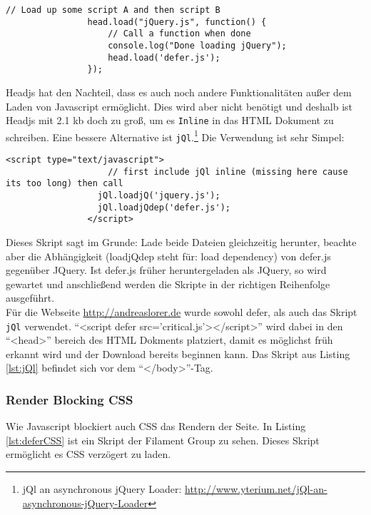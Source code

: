 				\begin{lstlisting}[captionpos=b, caption=Headjs dependency loading (Listing nach http://headjs.com/), label=lst:headjs]
				// Load up some script A and then script B
				head.load("jQuery.js", function() {
				    // Call a function when done
				    console.log("Done loading jQuery");
				    head.load('defer.js');
				});
				\end{lstlisting}

				Headjs hat den Nachteil, dass es auch noch andere Funktionalitäten außer dem Laden von Javascript ermöglicht. Dies wird aber nicht benötigt und deshalb ist Headjs mit 2.1 kb doch zu groß, um es \texttt{Inline} in das HTML Dokument zu schreiben. Eine bessere Alternative ist \texttt{jQl}.\footnote{jQl an asynchronous jQuery Loader: \url{http://www.yterium.net/jQl-an-asynchronous-jQuery-Loader}}
				Die Verwendung ist sehr Simpel:

				\begin{lstlisting}[captionpos=b, caption=jQl asynchronous jQuery-Loader, label=lst:jQl]
				<script type="text/javascript">
					// first include jQl inline (missing here cause its too long) then call
				  jQl.loadjQ('jquery.js');
				  jQl.loadjQdep('defer.js');
				</script>
				\end{lstlisting}

				Dieses Skript sagt im Grunde: Lade beide Dateien gleichzeitig herunter, beachte aber die Abhängigkeit (loadjQdep steht für: load dependency) von defer.js gegenüber JQuery. Ist defer.js früher heruntergeladen als JQuery, so wird gewartet und anschließend werden die Skripte in der richtigen Reihenfolge ausgeführt.\\

				Für die Webseite \url{http://andreaslorer.de} wurde sowohl defer, als auch das Skript \texttt{jQl} verwendet. "`<script defer src='critical.js'></script>"' wird dabei in den "`<head>"' bereich des HTML Dokments platziert, damit es möglichst früh erkannt wird und der Download bereits beginnen kann. Das Skript aus Listing \ref{lst:jQl} befindet sich vor dem "`</body>"'-Tag.

				\pagebreak


			\subsubsection{Render Blocking CSS} %
			\label{ssub:render_blocking_css}
				Wie Javascript blockiert auch CSS das Rendern der Seite. In Listing \ref{lst:deferCSS} ist ein Skript der Filament Group zu sehen. Dieses Skript ermöglicht es CSS verzögert zu laden. 

